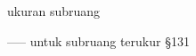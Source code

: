 ukuran subruang

----- untuk subruang terukur \S131






















































































































